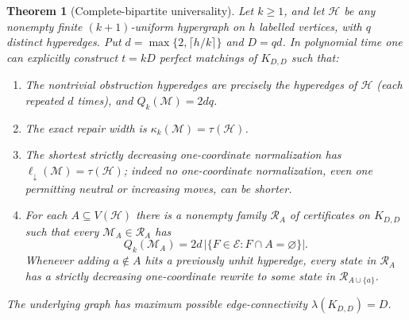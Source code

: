 \documentclass[10pt]{article}
\newtheorem{theorem}{Theorem}[section]
\newcommand{\M}{\mathcal M}
\newcommand{\Hh}{\mathcal H}
\newcommand{\kc}{\kappa_k}
\newcommand{\ellstr}{\ell_\downarrow}
\begin{document}
\begin{theorem}[Complete-bipartite universality]\label{thm:univ}
Let $k\ge1$, and let $\Hh$ be any nonempty finite $(k+1)$-uniform hypergraph on $h$ labelled vertices, with $q$ distinct hyperedges. Put $d=\max\{2,\lceil h/k\rceil\}$ and $D=qd$. In polynomial time one can explicitly construct $t=kD$ perfect matchings of $K_{D,D}$ such that:
\begin{enumerate}
\item The nontrivial obstruction hyperedges are precisely the hyperedges of $\Hh$ (each repeated $d$ times), and $Q_k(\M)=2dq$.
\item The exact repair width is $\kc(\M)=\tau(\Hh)$.
\item The shortest strictly decreasing one-coordinate normalization has $\ellstr(\M)=\tau(\Hh)$; indeed no one-coordinate normalization, even one permitting neutral or increasing moves, can be shorter.
\item For each $A\subseteq V(\Hh)$ there is a nonempty family $\mathcal R_A$ of certificates on $K_{D,D}$ such that every $\M_A\in\mathcal R_A$ has
\begin{equation}\label{eq:landscape}
Q_k(\M_A)=2d\,|\{F\in\mathcal E:F\cap A=\varnothing\}|.
\end{equation}
Whenever adding $a\notin A$ hits a previously unhit hyperedge, every state in $\mathcal R_A$ has a strictly decreasing one-coordinate rewrite to some state in $\mathcal R_{A\cup\{a\}}$.
\end{enumerate}
The underlying graph has maximum possible edge-connectivity $\lambda(K_{D,D})=D$.
\end{theorem}
\end{document}
